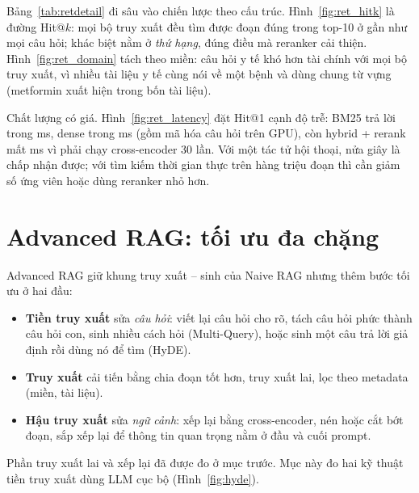 Bảng~\ref{tab:retdetail} đi sâu vào chiến lược theo cấu trúc. Hình~\ref{fig:ret_hitk} là đường Hit@$k$: mọi bộ
truy xuất đều tìm được đoạn đúng trong top-10 ở gần như mọi câu hỏi; khác biệt nằm ở \emph{thứ hạng}, đúng điều
mà reranker cải thiện. Hình~\ref{fig:ret_domain} tách theo miền: câu hỏi y tế khó hơn tài chính với mọi bộ truy
xuất, vì nhiều tài liệu y tế cùng nói về một bệnh và dùng chung từ vựng (metformin xuất hiện trong bốn tài liệu).


Chất lượng có giá. Hình~\ref{fig:ret_latency} đặt Hit@1 cạnh độ trễ: BM25 trả lời trong
 ms, dense trong 
ms (gồm mã hóa câu hỏi trên GPU), còn hybrid + rerank mất 
ms vì phải chạy cross-encoder 30 lần. Với một tác tử hội thoại, nửa giây là chấp nhận được; với tìm kiếm thời gian
thực trên hàng triệu đoạn thì cần giảm số ứng viên hoặc dùng reranker nhỏ hơn.


\section{Advanced RAG: tối ưu đa chặng}
Advanced RAG giữ khung truy xuất -- sinh của Naive RAG nhưng thêm bước tối ưu ở hai đầu:

\begin{itemize}
  \item \textbf{Tiền truy xuất} sửa \emph{câu hỏi}: viết lại câu hỏi cho rõ, tách câu hỏi phức thành câu hỏi con,
        sinh nhiều cách hỏi (Multi-Query), hoặc sinh một câu trả lời giả định rồi dùng nó để tìm (HyDE).
  \item \textbf{Truy xuất} cải tiến bằng chia đoạn tốt hơn, truy xuất lai, lọc theo metadata (miền, tài liệu).
  \item \textbf{Hậu truy xuất} sửa \emph{ngữ cảnh}: xếp lại bằng cross-encoder, nén hoặc cắt bớt đoạn, sắp xếp lại
        để thông tin quan trọng nằm ở đầu và cuối prompt.
\end{itemize}

Phần truy xuất lai và xếp lại đã được đo ở mục trước. Mục này đo hai kỹ thuật tiền truy xuất dùng LLM cục bộ
(Hình~\ref{fig:hyde}).

